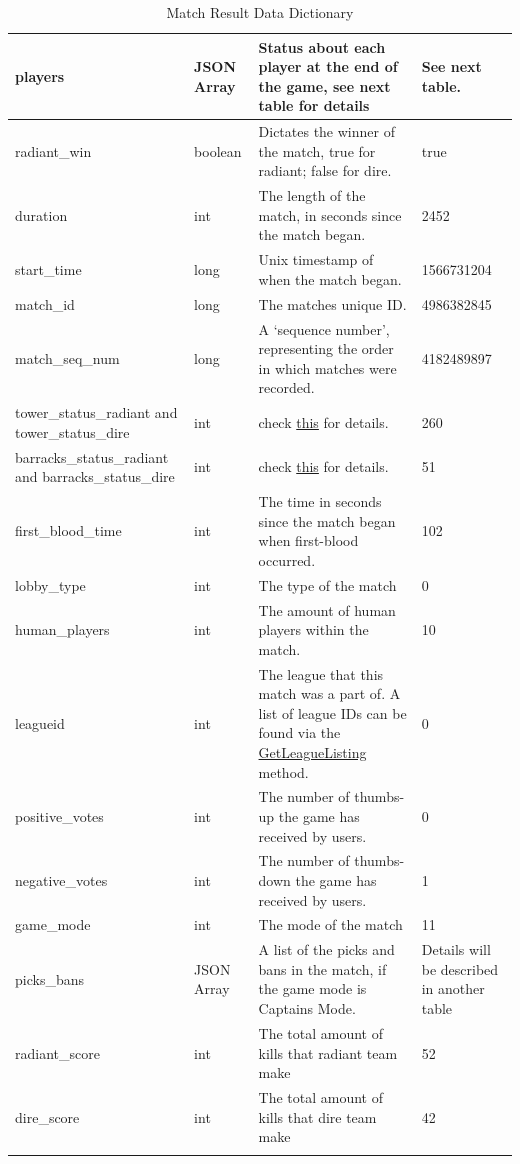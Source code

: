\documentclass{article}
\begin{document}
\begin{center}
\begin{longtable}{|p{3cm}|p{2cm}|p{5cm}|p{3cm}|}
players & JSON Array  & Status about each player at the end of the game, see next table for details & See next table.
\\
\hline
radiant\_win & boolean  & Dictates the winner of the match, true for radiant; false for dire. &true \\
\hline
duration  & int  & The length of the match, in seconds since the match began.  & 2452 \\
\hline
start\_time  & long  & Unix timestamp of when the match began.  & 1566731204 \\
\hline
match\_id  & long  & The matches unique ID.  & 4986382845 \\
\hline
match\_seq\_num  & long  & A `sequence number', representing the order in which matches were recorded.  & 4182489897 \\
\hline
tower\_status\_radiant and tower\_status\_dire  & int  & check \href{https://wiki.teamfortress.com/wiki/WebAPI/GetMatchDetails\#Tower\_Status}{this} for details.  & 260 \\
\hline
barracks\_status\_radiant and barracks\_status\_dire  & int  & check \href{https://wiki.teamfortress.com/wiki/WebAPI/GetMatchDetails\#Barracks\_Status}{this} for details. & 51 \\
\hline
first\_blood\_time  & int  & The time in seconds since the match began when first-blood occurred.  & 102 \\
\hline
lobby\_type  & int  & The type of the match  & 0 \\
\hline
human\_players  & int  & The amount of human players within the match.  & 10 \\
\hline
leagueid  & int  & The league that this match was a part of. A list of league IDs can be found via the \href{https://wiki.teamfortress.com/wiki/WebAPI/GetLeagueListing}{GetLeagueListing} method.
  & 0 \\
\hline
positive\_votes  & int  & The number of thumbs-up the game has received by users.  & 0 \\
\hline
negative\_votes  & int  & The number of thumbs-down the game has received by users.  & 1 \\
\hline
game\_mode  & int  & The mode of the match  & 11 \\
\hline
picks\_bans  & JSON Array  & A list of the picks and bans in the match, if the game mode is Captains Mode.  & Details will be described in another table \\
\hline
radiant\_score  & int  & The total amount of kills that radiant team make  & 52 \\
\hline
dire\_score  & int  & The total amount of kills that dire team make  & 42 \\
\hline
\caption{Match Result Data Dictionary}
\end{longtable}
\label{match-result-data-dictionary}
\end{center}
\end{document}

